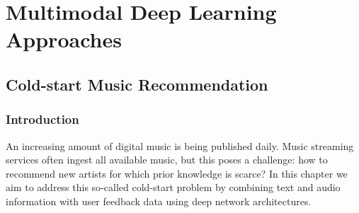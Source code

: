 
\part{Multimodal Deep Learning Approaches}
\label{part:multimodal-deep}

\chapter{Cold-start Music Recommendation}
\label{sec:cold-rec}

\section{Introduction}\label{sec:cold-rec:intro}
\label{sec:cold-rec:intro}



An increasing amount of digital music is being published daily. Music streaming services often ingest all available music, but this poses a challenge: how to recommend new artists for which prior knowledge is scarce? In this chapter we aim to address this so-called cold-start problem by combining text and audio information with user feedback data using deep network architectures. 


